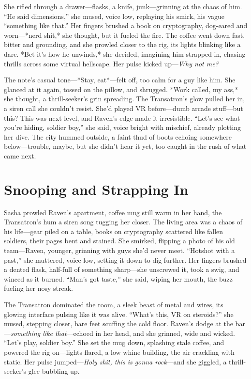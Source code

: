 \documentclass[12pt]{book}
\begin{document}
She rifled through a drawer—flasks, a knife, junk—grinning at the chaos of him. “He said dimensions,” she mused, voice low, replaying his smirk, his vague “something like that.” Her fingers brushed a book on cryptography, dog-eared and worn—*nerd shit,* she thought, but it fueled the fire. The coffee went down fast, bitter and grounding, and she prowled closer to the rig, its lights blinking like a dare. *Bet it’s how he unwinds,* she decided, imagining him strapped in, chasing thrills across some virtual hellscape. Her pulse kicked up—\textit{Why not me?}

The note’s casual tone—*Stay, eat*—felt off, too calm for a guy like him. She glanced at it again, tossed on the pillow, and shrugged. *Work called, my ass,* she thought, a thrill-seeker’s grin spreading. The Transatron’s glow pulled her in, a siren call she couldn’t resist. She’d played VR before—dumb arcade stuff—but this? This was next-level, and Raven’s edge made it irresistible. “Let’s see what you’re hiding, soldier boy,” she said, voice bright with mischief, already plotting her dive. The city hummed outside, a faint thud of boots echoing somewhere below—trouble, maybe, but she didn’t hear it yet, too caught in the rush of what came next.

\section{Snooping and Strapping In}

Sasha prowled Raven’s apartment, coffee mug still warm in her hand, the Transatron’s hum a siren song tugging her closer. The living area was a chaos of his life—gear piled on a table, books on cryptography scattered like fallen soldiers, their pages bent and stained. She smirked, flipping a photo of his old team—Raven, younger, grinning with guys she’d never meet. “Hotshot with a past,” she muttered, voice low, setting it down to dig further. Her fingers brushed a dented flask, half-full of something sharp—she unscrewed it, took a swig, and winced as it burned. “Man’s got taste,” she said, wiping her mouth, the buzz fueling her nosy streak.

The Transatron dominated the room, a sleek beast of metal and wires, its glowing interface pulsing like it was alive. “What’s this, VR on steroids?” she mused, stepping closer, bare feet scuffing the cold floor. Raven’s dodge at the bar—\textit{something like that}—echoed in her head, and she grinned, wide and wicked. “Let’s play, soldier boy.” She set the mug down, splashing stale coffee, and powered the rig on—lights flared, a low whine building, the air crackling with static. Her pulse jumped—\textit{Holy shit, this is gonna rock}—and she giggled, a thrill-seeker’s glee bubbling up.
\end{document}
